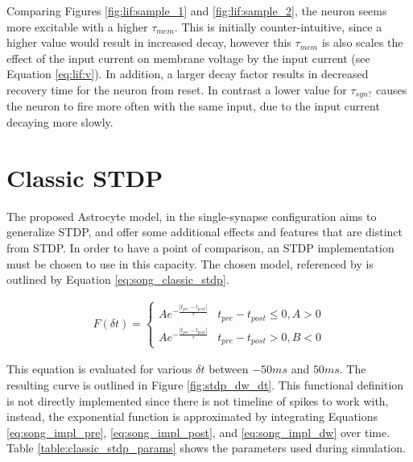 

Comparing Figures \ref{fig:lif:sample_1} and \ref{fig:lif:sample_2}, the
neuron seems more excitable with a higher $\tau_{mem}$. This is initially
counter-intuitive, since a higher value would result in increased decay,
however this $\tau_{mem}$ is also scales the effect of the input current on
membrane voltage by the input current (see Equation \ref{eq:lif:v}). In
addition, a larger decay factor results in decreased recovery time for the
neuron from reset. In contrast a lower value for $\tau_{syn?}$ causes the
neuron to fire more often with the same input, due to the input current
decaying more slowly.

\section{Classic STDP} \label{obj1:sec:classic_stdp}
    
The proposed Astrocyte model, in the single-synapse configuration aims to
generalize STDP, and offer some additional effects and features that are
distinct from STDP. In order to have a point of comparison, an STDP
implementation must be chosen to use in this capacity. The chosen model,
referenced by \cite{song_2000} is outlined by Equation
\ref{eq:song_classic_stdp}.

\begin{align}
  F(\delta t) =
  \begin{cases} 
    Ae^{- \frac{|t_{pre}-t_{post}|}{\tau}} & t_{pre} - t_{post} \leq 0, A > 0
    \\ Ae^{- \frac{|t_{pre}-t_{post}|}{\tau}} & t_{pre} - t_{post} > 0, B < 0
  \end{cases} \label{eq:song_classic_stdp}
\end{align}

This equation is evaluated for various $\delta t$ between $-50ms$ and
$50ms$. The resulting curve is outlined in Figure \ref{fig:stdp_dw_dt}. This
functional definition is not directly implemented since there is not timeline of
spikes to work with, instead, the exponential function is approximated by
integrating Equations \ref{eq:song_impl_pre}, \ref{eq:song_impl_post}, and
\ref{eq:song_impl_dw} over time. Table \ref{table:classic_stdp_params} shows the
parameters used during simulation.

